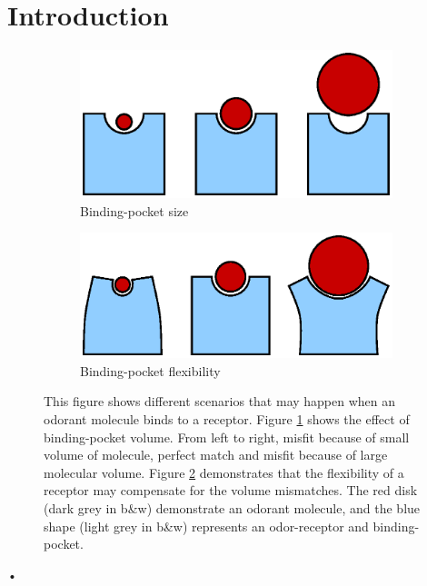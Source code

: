 \documentclass[11pt]{paper} %
\begin{document}
\section{Introduction}
\begin{figure}
	\centering
	\begin{subfigure}[b]{0.45 \textwidth}
		\includegraphics[width=\textwidth]{fig/binding-pocket}
		\caption{Binding-pocket size}
		\label{fig:pocket-size}
	\end{subfigure}
	\begin{subfigure}[b]{0.45 \textwidth}
		\includegraphics[width=\textwidth]{fig/binding-pocket-flex}
		\caption{Binding-pocket flexibility}
		\label{fig:pocket-flex}
	\end{subfigure}
	\caption{This figure shows different scenarios that may happen when an odorant molecule binds to a receptor. 
	Figure \ref{fig:pocket-size} shows the effect of binding-pocket volume. 
	From left to right, misfit because of small volume of molecule, perfect match and misfit because of large molecular volume.
	Figure \ref{fig:pocket-flex} demonstrates that the flexibility of a receptor may compensate for the volume mismatches. 
	The red disk (dark grey in b\&w) demonstrate an odorant molecule, 
	and the blue shape (light grey in b\&w) represents an odor-receptor and binding-pocket.}
	\label{fig:binding-pocket}
\end{figure}•
\end{document}
